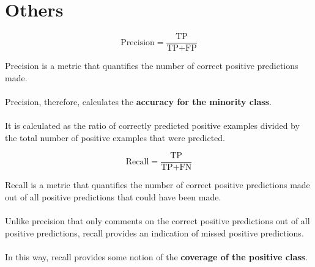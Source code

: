 \section{Others}
\[\text{Precision} = \frac{\text{TP}}{\text{TP}+\text{FP}}\]

Precision is a metric that quantifies the number of correct positive predictions made.\\\\
Precision, therefore, calculates the \textbf{accuracy for the minority class}.\\\\
It is calculated as the ratio of correctly predicted positive examples divided by the total number of positive examples that were predicted.

\[\text{Recall} = \frac{\text{TP}}{\text{TP}+\text{FN}}\]

Recall is a metric that quantifies the number of correct positive predictions made out of all positive predictions that could have been made.\\\\
Unlike precision that only comments on the correct positive predictions out of all positive predictions, recall provides an indication of missed positive predictions.\\\\
In this way, recall provides some notion of the \textbf{coverage of the positive class}.
